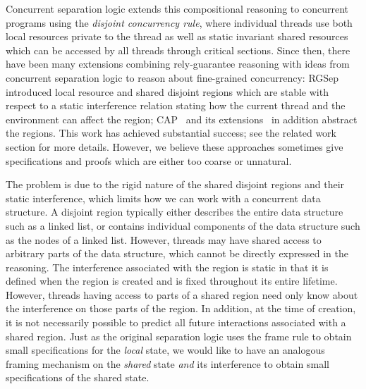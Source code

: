 Concurrent separation logic extends this compositional reasoning to
concurrent programs using the {\em disjoint concurrency rule}, where
individual threads use both local resources private to the
thread as well as static invariant shared resources which can be accessed by
all threads through critical sections. Since then, there have been many
extensions combining rely-guarantee reasoning with ideas from
concurrent separation logic to reason about fine-grained concurrency:
RGSep~\cite{viktor-marriage} 
introduced local resource and shared disjoint
regions which are stable with respect to a static interference
relation stating how the current thread and the environment can affect
the region; CAP~\cite{cap-ecoop10} and its
extensions~\cite{hocap,icap,tada} in addition abstract the
regions. This work has achieved substantial success; see the related
work section for more details. However, we believe these approaches
sometimes give specifications and proofs which are either too coarse
or unnatural.



The problem is due to the rigid nature of the shared disjoint regions and
their static interference, which   limits how we can  work
with a
concurrent data structure. A disjoint region typically either describes 
the entire data structure such as a linked list,  or contains
individual 
components of the data structure such as the nodes of a
linked list. However, threads may have shared access to arbitrary 
parts of the data structure, which cannot be directly expressed in the reasoning.
The interference associated with the region is static in that it is defined when
the region is created and is fixed throughout its entire lifetime. However, 
threads having access to parts of a shared region need only know about the interference on those parts of the
region. In addition, 
at the time  of creation, it is not necessarily possible
to predict all future interactions  associated with  a shared
region. Just as the original separation logic  uses the frame rule to
obtain small specifications for the \emph{local} state, we would like to have an analogous framing mechanism on the \emph{shared} state \emph{and} its
interference to obtain small
specifications of the shared state. 


